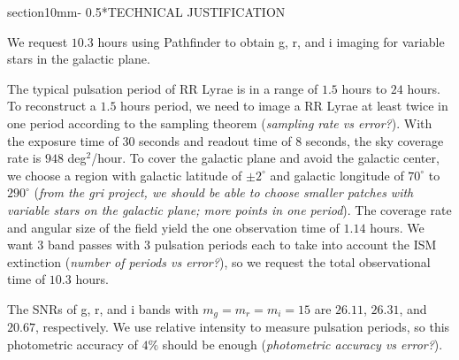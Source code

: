 \documentclass[letterpaper,11pt]{article}
\makeatletter
\renewcommand{\section}{\@startsection%
{section}{1}{0mm}{-\baselineskip}%
{0.5\baselineskip}{\normalfont\Large\bfseries}}%
\makeatother
\begin{document}
\noindent{}

\noindent{}

\noindent{}

\section*{TECHNICAL JUSTIFICATION}


We request $10.3$ hours using Pathfinder to obtain g, r, and i imaging for variable stars in the galactic plane.

\vspace{3mm} %

\noindent The typical pulsation period of RR Lyrae is in a range of $1.5$ hours to $24$ hours. To reconstruct a $1.5$ hours period, we need to image a RR Lyrae at least twice in one period according to the sampling theorem (\textit{sampling rate vs error?}). With the exposure time of $30$ seconds and readout time of $8$ seconds, the sky coverage rate is $948$ deg$^2$/hour. To cover the galactic plane and avoid the galactic center, we choose a region with galactic latitude of $\pm 2 ^\circ$ and galactic longitude of $70 ^\circ$ to $290 ^\circ$ (\textit{from the gri project, we should be able to choose smaller patches with variable stars on the galactic plane; more points in one period}). The coverage rate and angular size of the field yield the one observation time of $1.14$ hours. We want $3$ band passes with $3$ pulsation periods each to take into account the ISM extinction (\textit{number of periods vs error?}), so we request the total observational time of $10.3$ hours.

\vspace{3mm} %

\noindent The SNRs of g, r, and i bands with $m_g = m_r = m_i = 15$ are $26.11$, $26.31$, and $20.67$, respectively. We use relative intensity to measure pulsation periods, so this photometric accuracy of $4 \%$ should be enough (\textit{photometric accuracy vs error?}).
\end{document}
